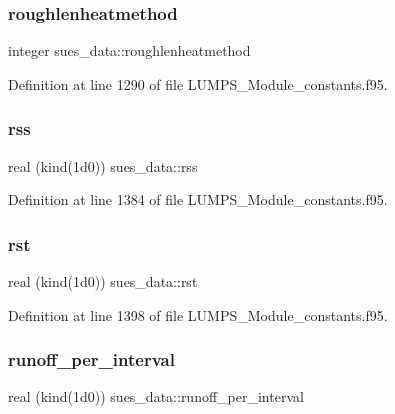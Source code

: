 \mbox{\label{namespacesues__data_a9dff10e1f001cc8241e5d1d72a4beeb2}} 
\subsubsection{\texorpdfstring{roughlenheatmethod}{roughlenheatmethod}}
{\footnotesize\ttfamily integer sues\+\_\+data\+::roughlenheatmethod}



Definition at line 1290 of file L\+U\+M\+P\+S\+\_\+\+Module\+\_\+constants.\+f95.

\mbox{\label{namespacesues__data_ae3375f2161517eabda778cd0642076c5}} 
\subsubsection{\texorpdfstring{rss}{rss}}
{\footnotesize\ttfamily real (kind(1d0)) sues\+\_\+data\+::rss}



Definition at line 1384 of file L\+U\+M\+P\+S\+\_\+\+Module\+\_\+constants.\+f95.

\mbox{\label{namespacesues__data_a590af4833961785e70adbad8cec1aa66}} 
\subsubsection{\texorpdfstring{rst}{rst}}
{\footnotesize\ttfamily real (kind(1d0)) sues\+\_\+data\+::rst}



Definition at line 1398 of file L\+U\+M\+P\+S\+\_\+\+Module\+\_\+constants.\+f95.

\mbox{\label{namespacesues__data_a3e74512061da577d1697d50324b5ea28}} 
\subsubsection{\texorpdfstring{runoff\+\_\+per\+\_\+interval}{runoff\_per\_interval}}
{\footnotesize\ttfamily real (kind(1d0)) sues\+\_\+data\+::runoff\+\_\+per\+\_\+interval}



